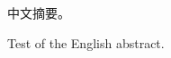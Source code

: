 
\begin{cabstract}
	中文摘要。
\end{cabstract}

\begin{eabstract}
	Test of the English abstract.
\end{eabstract}


